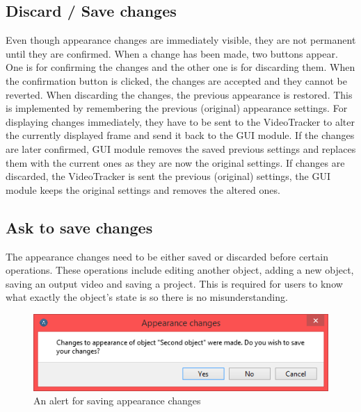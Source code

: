 \subsection{Discard / Save changes}
Even though appearance changes are immediately visible, they are not permanent until they are confirmed. When a change has been made, two buttons appear. One is for confirming the changes and the other one is for discarding them. When the confirmation button is clicked, the changes are accepted and they cannot be reverted. When discarding the changes, the previous appearance is restored. This is implemented by remembering the previous (original) appearance settings. For displaying changes immediately, they have to be sent to the VideoTracker to alter the currently displayed frame and send it back to the GUI module. If the changes are later confirmed, GUI module removes the saved previous settings and replaces them with the current ones as they are now the original settings. If changes are discarded, the VideoTracker is sent the previous (original) settings, the GUI module keeps the original settings and removes the altered ones.

\subsection{Ask to save changes}
The appearance changes need to be either saved or discarded before certain operations. These operations include editing another object, adding a new object, saving an output video and saving a project. This is required for users to know what exactly the object's state is so there is no misunderstanding. 
\begin{figure}[!htbp]
\centering
\includegraphics{png/save_appearance_changes}
\caption{An alert for saving appearance changes}
\label{fig:save_appearance_changes}
\end{figure}

